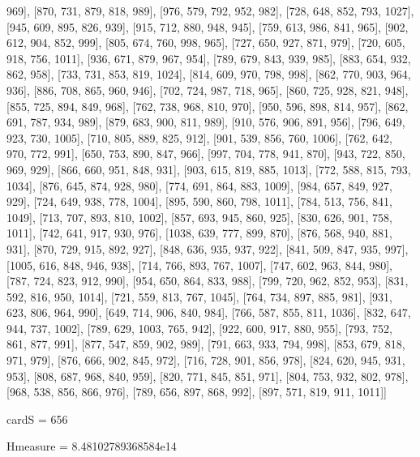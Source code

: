969], [870, 731, 879, 818, 989], [976, 579, 792, 952, 982], [728, 648, 852, 793, 1027], [945, 609, 895, 826, 939], [915, 712, 880, 948, 945], [759, 613, 986, 841, 965], [902, 612, 904, 852, 999], [805, 674, 760, 998, 965], [727, 650, 927, 871, 979], [720, 605, 918, 756, 1011], [936, 671, 879, 967, 954], [789, 679, 843, 939, 985], [883, 654, 932, 862, 958], [733, 731, 853, 819, 1024], [814, 609, 970, 798, 998], [862, 770, 903, 964, 936], [886, 708, 865, 960, 946], [702, 724, 987, 718, 965], [860, 725, 928, 821, 948], [855, 725, 894, 849, 968], [762, 738, 968, 810, 970], [950, 596, 898, 814, 957], [862, 691, 787, 934, 989], [879, 683, 900, 811, 989], [910, 576, 906, 891, 956], [796, 649, 923, 730, 1005], [710, 805, 889, 825, 912], [901, 539, 856, 760, 1006], [762, 642, 970, 772, 991], [650, 753, 890, 847, 966], [997, 704, 778, 941, 870], [943, 722, 850, 969, 929], [866, 660, 951, 848, 931], [903, 615, 819, 885, 1013], [772, 588, 815, 793, 1034], [876, 645, 874, 928, 980], [774, 691, 864, 883, 1009], [984, 657, 849, 927, 929], [724, 649, 938, 778, 1004], [895, 590, 860, 798, 1011], [784, 513, 756, 841, 1049], [713, 707, 893, 810, 1002], [857, 693, 945, 860, 925], [830, 626, 901, 758, 1011], [742, 641, 917, 930, 976], [1038, 639, 777, 899, 870], [876, 568, 940, 881, 931], [870, 729, 915, 892, 927], [848, 636, 935, 937, 922], [841, 509, 847, 935, 997], [1005, 616, 848, 946, 938], [714, 766, 893, 767, 1007], [747, 602, 963, 844, 980], [787, 724, 823, 912, 990], [954, 650, 864, 833, 988], [799, 720, 962, 852, 953], [831, 592, 816, 950, 1014], [721, 559, 813, 767, 1045], [764, 734, 897, 885, 981], [931, 623, 806, 964, 990], [649, 714, 906, 840, 984], [766, 587, 855, 811, 1036], [832, 647, 944, 737, 1002], [789, 629, 1003, 765, 942], [922, 600, 917, 880, 955], [793, 752, 861, 877, 991], [877, 547, 859, 902, 989], [791, 663, 933, 794, 998], [853, 679, 818, 971, 979], [876, 666, 902, 845, 972], [716, 728, 901, 856, 978], [824, 620, 945, 931, 953], [808, 687, 968, 840, 959], [820, 771, 845, 851, 971], [804, 753, 932, 802, 978], [968, 538, 856, 866, 976], [789, 656, 897, 868, 992], [897, 571, 819, 911, 1011]]

cardS = 656

Hmeasure = 8.48102789368584e14
